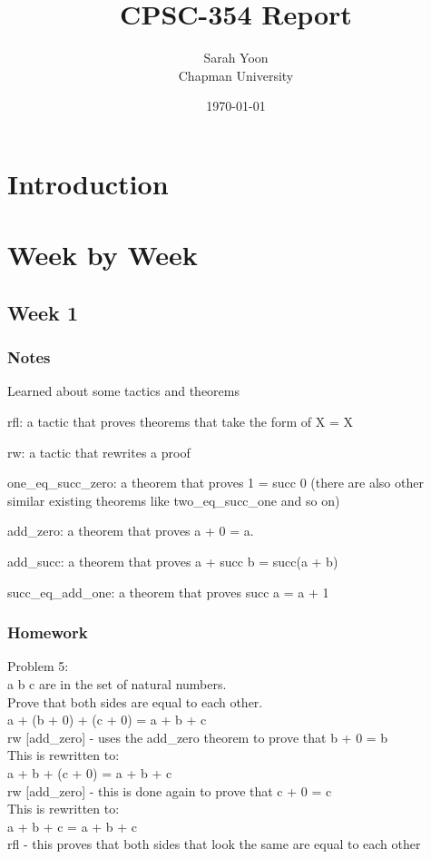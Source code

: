 \documentclass{article}
\title{CPSC-354 Report}
\author{Sarah Yoon  \\ Chapman University}
\date{\today}
\theoremstyle{theorem}
\theoremstyle{definition}
\theoremstyle{remark}
\begin{document}
\maketitle

\begin{abstract}

\end{abstract}

\setcounter{tocdepth}{3}
\tableofcontents

\section{Introduction}\label{intro}

\section{Week by Week}\label{homework}

\subsection{Week 1}

\subsubsection*{Notes}
Learned about some tactics and theorems

rfl: a tactic that proves theorems that take the form of X = X

rw: a tactic that rewrites a proof

one\_eq\_succ\_zero: a theorem that proves 1 = succ 0 (there are also other similar existing theorems like two\_eq\_succ\_one and so on)

add\_zero: a theorem that proves a + 0 = a.

add\_succ: a theorem that proves a + succ b = succ(a + b)

succ\_eq\_add\_one: a theorem that proves succ a = a + 1

\subsubsection*{Homework}
Problem 5: \\
a b c are in the set of natural numbers. \\
Prove that both sides are equal to each other. \\
a + (b + 0) + (c + 0) = a + b + c \\
rw [add\_zero] - uses the add\_zero theorem to prove that b + 0 = b \\
This is rewritten to: \\
a + b + (c + 0) = a + b + c \\
rw [add\_zero] - this is done again to prove that c + 0 = c \\ 
This is rewritten to: \\
a + b + c = a + b + c \\
rfl - this proves that both sides that look the same are equal to each other \\
\end{document}
